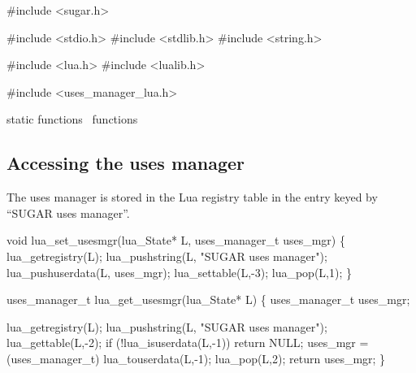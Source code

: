 \nwenddocs{}\endmoddef\nwstartdeflinemarkup\nwenddeflinemarkup
#include <sugar.h>

#include <stdio.h>
#include <stdlib.h>
#include <string.h>

#include <lua.h>
#include <lualib.h>

#include <uses_manager_lua.h>

\LA{}static functions~{\nwtagstyle{}}\RA{}
\LA{}functions~{\nwtagstyle{}}\RA{}

\nwendcode{}\nwdocspar


\subsection{Accessing the uses manager}

The uses manager is stored in the Lua registry table in the entry
keyed by ``SUGAR uses manager''.

\nwenddocs{}\endmoddef\nwstartdeflinemarkup{}\nwenddeflinemarkup
void lua_set_usesmgr(lua_State* L, uses_manager_t uses_mgr)
\{
    lua_getregistry(L);
    lua_pushstring(L, "SUGAR uses manager");
    lua_pushuserdata(L, uses_mgr);
    lua_settable(L,-3);
    lua_pop(L,1);
\}

\nwendcode{}\nwdocspar

\nwenddocs{}\plusendmoddef\nwstartdeflinemarkup{}\nwenddeflinemarkup
uses_manager_t lua_get_usesmgr(lua_State* L)
\{
    uses_manager_t uses_mgr;

    lua_getregistry(L);
    lua_pushstring(L, "SUGAR uses manager");
    lua_gettable(L,-2);
    if (!lua_isuserdata(L,-1))
        return NULL;
    uses_mgr = (uses_manager_t) lua_touserdata(L,-1);
    lua_pop(L,2);
    return uses_mgr;
\}

